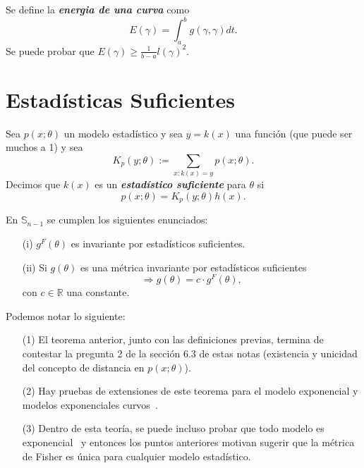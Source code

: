 \begin{example}
Se define la \textit{\textbf{energia de una curva}} como
\begin{equation*}
    E(\gamma)=\int_a^bg(\gamma,\gamma)dt.
\end{equation*}
Se puede probar que $E(\gamma)\geq \frac{1}{b-a}l(\gamma)^2$.
\end{example}

\section{Estad\'isticas Suficientes}

\begin{definition}
Sea $p(x;\theta)$ un modelo estad\'istico y sea $y=k(x)$ una funci\'on (que puede ser muchos a 1) y sea
\begin{equation*}
    K_p(y;\theta):=\sum_{x\colon k(x)=y}p(x;\theta).
\end{equation*}
Decimos que $k(x)$ es un \textit{\textbf{estad\'istico suficiente}} para $\theta$ si 
\begin{equation*}
    p(x;\theta)=K_p(y;\theta)h(x).
\end{equation*}
\end{definition}

\begin{theorem}
En $\mathbb{S}_{n-1}$ se cumplen los siguientes enunciados:
\begin{enumerate}
    \item[(i)] $g^F(\theta)$ es invariante por estad\'isticos suficientes.
    \item[(ii)] Si $g(\theta)$ es una m\'etrica invariante por estad\'isticos suficientes
    \begin{equation*}
        \Longrightarrow g(\theta)=c\cdot g^F(\theta),
    \end{equation*}
    con $c\in\mathbb R$ una constante.
\end{enumerate}
\end{theorem}

\begin{observation}
Podemos notar lo siguiente:
\begin{enumerate}
    \item[(1)] El teorema anterior, junto con las definiciones previas, termina de contestar la pregunta 2 de la secci\'on 6.3 de estas notas (existencia 
    y unicidad del concepto de distancia en $p(x;\theta)$).
    \item[(2)] Hay pruebas de extensiones de este teorema para el modelo exponencial y modelos exponenciales curvos~\cite{campbell1986extended,dowty2018chentsov}. 
    \item[(3)] Dentro de esta teor\'ia, se puede incluso probar que todo modelo es exponencial~\cite{brody2007note} y 
    entonces los puntos anteriores motivan sugerir que la m\'etrica de Fisher es \'unica para cualquier modelo estad\'istico.
\end{enumerate}
\end{observation}

